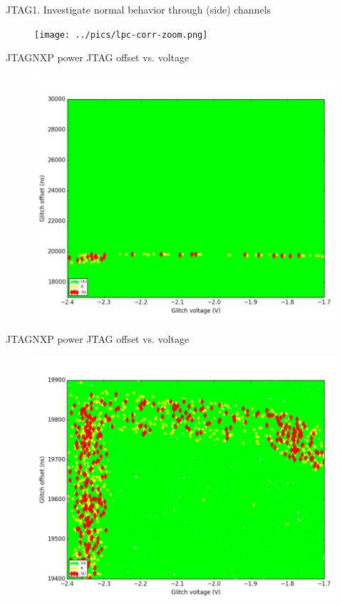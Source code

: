 \documentclass[table]{beamer}
\begin{document}
\begin{frame}{JTAG}{1. Investigate normal behavior through (side) channels }
    \begin{figure}[H]
      \centering
      \texttt{[image: ../pics/lpc-corr-zoom.png]}
    \end{figure}
\end{frame}

\begin{frame}{JTAG}{NXP power JTAG offset vs. voltage}
    \vspace{-.3cm}
    \begin{figure}[H]
      \centering
      \includegraphics[width=.8\textwidth]{../../plots/newplots/nxp-jtag-voltage-offset.png}
    \end{figure}
\end{frame}

\begin{frame}{JTAG}{NXP power JTAG offset vs. voltage}
    \vspace{-.3cm}
    \begin{figure}[H]
      \centering
      \includegraphics[width=.8\textwidth]{../../plots/newplots/nxp-jtag-voltage-offset-2.png}
    \end{figure}
\end{frame}
\end{document}
